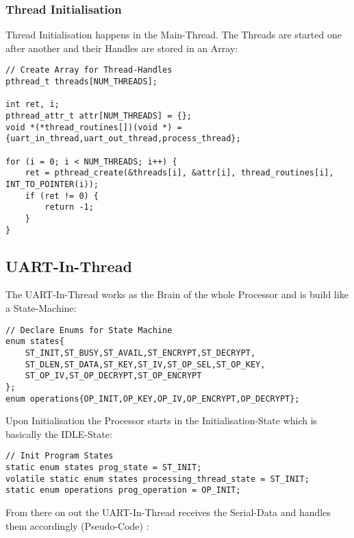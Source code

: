 \pagebreak

\subsubsection{Thread Initialisation}

Thread Initialisation happens in the Main-Thread.
The Threads are started one after another and their Handles are stored
in an Array:

\begin{lstlisting}[style=CStyle,caption=Thread Initialisation]
// Create Array for Thread-Handles
pthread_t threads[NUM_THREADS];

int ret, i;
pthread_attr_t attr[NUM_THREADS] = {};
void *(*thread_routines[])(void *) = {uart_in_thread,uart_out_thread,process_thread};

for (i = 0; i < NUM_THREADS; i++) {
	ret = pthread_create(&threads[i], &attr[i], thread_routines[i], INT_TO_POINTER(i));
	if (ret != 0) {
		return -1;
	}
}
\end{lstlisting}

\subsection{UART-In-Thread}

The UART-In-Thread works as the Brain of the whole Processor and is build
like a State-Machine:

\begin{lstlisting}[style=CStyle,caption=State Definitions]
// Declare Enums for State Machine
enum states{
	ST_INIT,ST_BUSY,ST_AVAIL,ST_ENCRYPT,ST_DECRYPT,
	ST_DLEN,ST_DATA,ST_KEY,ST_IV,ST_OP_SEL,ST_OP_KEY,
	ST_OP_IV,ST_OP_DECRYPT,ST_OP_ENCRYPT
};
enum operations{OP_INIT,OP_KEY,OP_IV,OP_ENCRYPT,OP_DECRYPT};
\end{lstlisting}

Upon Initialisation the Processor starts in the Initialisation-State which
is basically the IDLE-State:

\begin{lstlisting}
// Init Program States
static enum states prog_state = ST_INIT;
volatile static enum states processing_thread_state = ST_INIT;
static enum operations prog_operation = OP_INIT;
\end{lstlisting}

\pagebreak

From there on out the UART-In-Thread receives the Serial-Data and
handles them accordingly (Pseudo-Code) :

